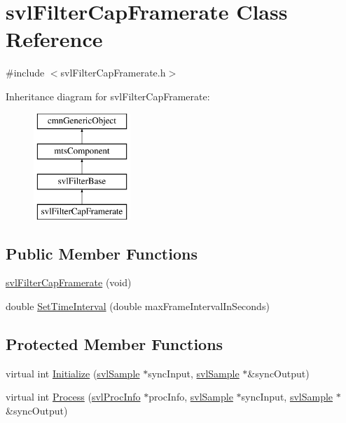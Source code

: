 \hypertarget{classsvl_filter_cap_framerate}{\section{svl\-Filter\-Cap\-Framerate Class Reference}
\label{classsvl_filter_cap_framerate}
}


{\ttfamily \#include $<$svl\-Filter\-Cap\-Framerate.\-h$>$}

Inheritance diagram for svl\-Filter\-Cap\-Framerate\-:\begin{figure}[H]
\begin{center}
\leavevmode
\includegraphics[height=4.000000cm]{db/d96/classsvl_filter_cap_framerate}
\end{center}
\end{figure}
\subsection*{Public Member Functions}
\begin{DoxyCompactItemize}
\item 
\hyperlink{classsvl_filter_cap_framerate_a87179f77b77ce423103d5fb72270f975}{svl\-Filter\-Cap\-Framerate} (void)
\item 
double \hyperlink{classsvl_filter_cap_framerate_a4a30219e73e404fe8d8926d129f44bd2}{Set\-Time\-Interval} (double max\-Frame\-Interval\-In\-Seconds)
\end{DoxyCompactItemize}
\subsection*{Protected Member Functions}
\begin{DoxyCompactItemize}
\item 
virtual int \hyperlink{classsvl_filter_cap_framerate_ac226b76bcaaac4a368c09ed3989bb0db}{Initialize} (\hyperlink{classsvl_sample}{svl\-Sample} $\ast$sync\-Input, \hyperlink{classsvl_sample}{svl\-Sample} $\ast$\&sync\-Output)
\item 
virtual int \hyperlink{classsvl_filter_cap_framerate_a1cefa7adcea2dc1ccc2eefe7be2e83cc}{Process} (\hyperlink{structsvl_proc_info}{svl\-Proc\-Info} $\ast$proc\-Info, \hyperlink{classsvl_sample}{svl\-Sample} $\ast$sync\-Input, \hyperlink{classsvl_sample}{svl\-Sample} $\ast$\&sync\-Output)
\end{DoxyCompactItemize}
